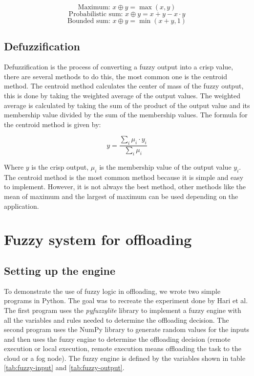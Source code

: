 \begin{minipage}{0.9624\textwidth}
	\begin{equation}
		\text{Maximum: } x \oplus y = \max(x, y)
	\end{equation}
	\begin{equation}
		\text{Probabilistic sum: } x \oplus y = x + y - x \cdot y
	\end{equation}
	\begin{equation}
		\text{Bounded sum: } x \oplus y = \min(x + y, 1)
	\end{equation}
\end{minipage}

\subsection{Defuzzification}
\label{subsec:fuzzy-defuzzification}

Defuzzification is the process of converting a fuzzy output into a crisp value, there are several methods to do this,
the most common one is the centroid method. The centroid method calculates the center of mass of the fuzzy output, this
is done by taking the weighted average of the output values. The weighted average is calculated by taking the sum of
the product of the output value and its membership value divided by the sum of the membership values. The formula for
the centroid method is given by:

\begin{equation}
	y = \frac{\sum_{i} \mu_i \cdot y_i}{\sum_{i} \mu_i}
\end{equation}

Where $y$ is the crisp output, $\mu_i$ is the membership value of the output value $y_i$. The centroid method is the
most common method because it is simple and easy to implement. However, it is not always the best method, other methods
like the mean of maximum and the largest of maximum can be used depending on the application.

\section{Fuzzy system for offloading}
\label{sec:fuzzy-offloading}

\subsection{Setting up the engine}
\label{subsec:fuzzy-setup}

To demonstrate the use of fuzzy logic in offloading, we wrote two simple programs in Python. The goal was to recreate
the experiment done by Hari et al.\cite{Hari-et-al-2018} The first program uses the \textit{pyfuzzylite}\cite{fuzzylite}
library to implement a fuzzy engine with all the variables and rules needed to determine the offloading decision. The
second program uses the NumPy library to generate random values for the inputs and then uses the fuzzy engine to determine
the offloading decision (remote execution or local execution, remote execution means offloading the task to the cloud or
a fog node). The fuzzy engine is defined by the variables shown in table \ref{tab:fuzzy-input} and \ref{tab:fuzzy-output}.

